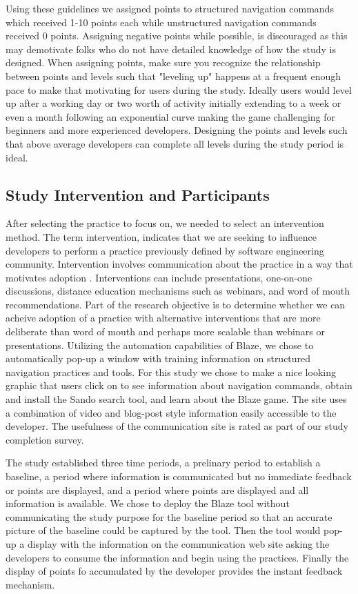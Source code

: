 \documentclass{sig-alternate}
\begin{document}
Using these guidelines we assigned points to structured navigation commands which received 1-10 points each while unstructured navigation commands received 0 points.  Assigning negative points while possible, is discouraged as this may demotivate folks who do not have detailed knowledge of how the study is designed.  When assigning points, make sure you recognize the relationship between points and levels such that "leveling up" happens at a frequent enough pace to make that motivating for users during the study.  Ideally users would level up after a working day or two worth of activity initially extending to a week or even a month following an exponential curve \cite{wbsnipes:Hamari2011Framework} making the game challenging for beginners and more experienced developers.  Designing the points and levels such that above average developers can complete all levels during the study period is ideal.

\subsection{Study Intervention and Participants}

After selecting the practice to focus on, we needed to select an intervention method.  The term intervention, indicates that we are seeking to influence developers to perform a practice previously defined by software engineering community.  Intervention involves communication about the practice in a way that motivates adoption \cite{}.  Interventions can include presentations, one-on-one discussions, distance education mechanisms such as webinars, and word of mouth recommendations.  Part of the research objective is to determine whether we can acheive adoption of a practice with alternative interventions that are more deliberate than word of mouth and perhaps more scalable than webinars or presentations.  Utilizing the automation capabilities of Blaze, we chose to automatically pop-up a window with training information on structured navigation practices and tools. For this study we chose to make a nice looking graphic that users click on to see information about navigation commands, obtain and install the Sando search tool, and learn about the Blaze game.  The site uses a combination of video and blog-post style information easily accessible to the developer.  The usefulness of the communication site is rated as part of our study completion survey.

The study established three time periods, a prelinary period to establish a baseline, a period where information is communicated but no immediate feedback or points are displayed, and a period where points are displayed and all information is available.  We chose to deploy the Blaze tool without communicating the study purpose for the baseline period so that an accurate picture of the baseline could be captured by the tool.  Then the tool would pop-up a display with the information on the communication web site asking the developers to consume the information and begin using the practices.   Finally the display of points fo accumulated by the developer provides the instant feedback mechanism.  
\end{document}
